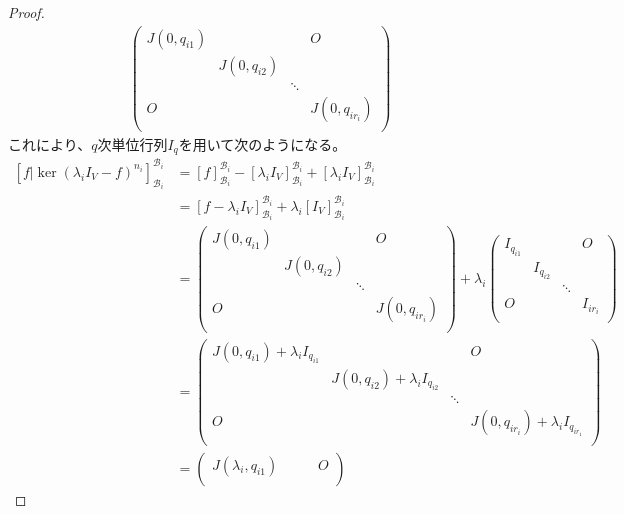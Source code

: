 \documentclass[dvipdfmx]{jsarticle}
\begin{document}
\begin{proof}
\begin{align*}
\begin{pmatrix}
J\left( 0,q_{i1} \right) & \  & \  & O \\
\  & J\left( 0,q_{i2} \right) & \  & \  \\
\  & \  & \ddots & \  \\
O & \  & \  & J\left( 0,q_{ir_{i}} \right) \\
\end{pmatrix}
\end{align*}
これにより、$q$次単位行列$I_{q}$を用いて次のようになる。
\begin{align*}
\left[ f|\ker\left( \lambda_{i}I_{V} - f \right)^{n_{i}} \right]_{\mathcal{B}_{i}}^{\mathcal{B}_{i}} &= [ f]_{\mathcal{B}_{i}}^{\mathcal{B}_{i}} - \left[ \lambda_{i}I_{V} \right]_{\mathcal{B}_{i}}^{\mathcal{B}_{i}} + \left[ \lambda_{i}I_{V} \right]_{\mathcal{B}_{i}}^{\mathcal{B}_{i}}\\
&= \left[ f - \lambda_{i}I_{V} \right]_{\mathcal{B}_{i}}^{\mathcal{B}_{i}} + \lambda_{i}\left[ I_{V} \right]_{\mathcal{B}_{i}}^{\mathcal{B}_{i}}\\
&= \begin{pmatrix}
J\left( 0,q_{i1} \right) & \  & \  & O \\
\  & J\left( 0,q_{i2} \right) & \  & \  \\
\  & \  & \ddots & \  \\
O & \  & \  & J\left( 0,q_{ir_{i}} \right) \\
\end{pmatrix} + \lambda_{i}\begin{pmatrix}
I_{q_{i1}} & \  & \  & O \\
\  & I_{q_{i2}} & \  & \  \\
\  & \  & \ddots & \  \\
O & \  & \  & I_{ir_{i}} \\
\end{pmatrix}\\
&= \begin{pmatrix}
J\left( 0,q_{i1} \right) + \lambda_{i}I_{q_{i1}} & \  & \  & O \\
\  & J\left( 0,q_{i2} \right) + \lambda_{i}I_{q_{i2}} & \  & \  \\
\  & \  & \ddots & \  \\
O & \  & \  & J\left( 0,q_{ir_{i}} \right) + \lambda_{i}I_{q_{ir_{1}}} \\
\end{pmatrix}\\
&= \begin{pmatrix}
J\left( \lambda_{i},q_{i1} \right) & \  & \  & O \\

\end{pmatrix}
\end{align*}
\end{proof}
\end{document}
